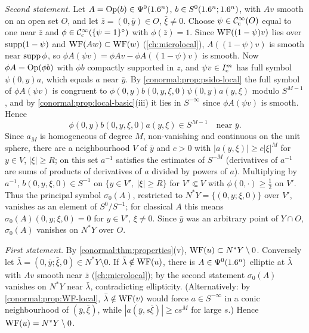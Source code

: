 \emph{Second statement.} Let $A=\operatorname{Op}(b)\in\Psi^{0}(1.6^n)$, $b\in S^0(1.6^n;1.6^n)$, with $Av$
smooth on an open set $O$, and let $\bar z=(0,\bar y)\in O$, $\bar\xi\ne0$. Choose
$\psi\in\mathcal{C}^\infty_{\mathrm{c}}(O)$ equal to one near $\bar z$ and $\phi\in\mathcal{C}^\infty_{\mathrm{c}}(\{\psi=1\}^\circ)$ with
$\phi(\bar z)=1$. Since $\operatorname{WF}((1-\psi)v)$ lies over $\operatorname{supp}(1-\psi)$ and $\operatorname{WF}(Aw)\subset\operatorname{WF}(w)$
(\cref{ch:microlocal}), $A((1-\psi)v)$ is smooth near $\operatorname{supp}\phi$, so $\phi A(\psi v)=\phi Av
-\phi A((1-\psi)v)$ is smooth. Now $\phi A=\operatorname{Op}(\phi b)$ with $\phi b$ compactly supported in
$z$, and $\psi v\in I^{m}_{\mathrm c}$ has full symbol $\psi(0,y)a$, which equals $a$ near
$\bar y$. By \cref{conormal:prop:psido-local} the full symbol of $\phi A(\psi v)$ is
congruent to $\phi(0,y)b(0,y,\xi,0)\psi(0,y)a(y,\xi)$ modulo $S^{M-1}$, and by
\cref{conormal:prop:local-basic}(iii) it lies in $S^{-\infty}$ since $\phi A(\psi v)$ is
smooth. Hence
\begin{equation*}
\phi(0,y)b(0,y,\xi,0)a(y,\xi)\in S^{M-1}\quad\text{near }\bar y .
\end{equation*}
Since $a_M$ is homogeneous of degree $M$, non-vanishing and continuous on the unit sphere,
there are a neighbourhood $V$ of $\bar y$ and $c>0$ with $|a(y,\xi)|\ge c|\xi|^M$ for
$y\in V$, $|\xi|\ge R$; on this set $a^{-1}$ satisfies the estimates of $S^{-M}$ (derivatives
of $a^{-1}$ are sums of products of derivatives of $a$ divided by powers of $a$). Multiplying
by $a^{-1}$, $b(0,y,\xi,0)\in S^{-1}$ on $\{y\in V',\ |\xi|\ge R\}$ for $V'\Subset V$ with
$\phi(0,\cdot)\ge\frac12$ on $V'$. Thus the principal symbol $\sigma_0(A)$, restricted to
$N^*Y=\{(0,y;\xi,0)\}$ over $V'$, vanishes as an element of $S^{0}/S^{-1}$; for classical
$A$ this means $\sigma_0(A)(0,y;\xi,0)=0$ for $y\in V'$, $\xi\ne0$. Since $\bar y$ was an
arbitrary point of $Y\cap O$, $\sigma_0(A)$ vanishes on $N^*Y$ over $O$.

\emph{First statement.} By \cref{conormal:thm:properties}(v), $\operatorname{WF}(u)\subset N^*Y\setminus0$.
Conversely let $\bar\lambda=(0,\bar y;\bar\xi,0)\in N^*Y\setminus0$. If $\bar\lambda\notin
\operatorname{WF}(u)$, there is $A\in\Psi^{0}(1.6^n)$ elliptic at $\bar\lambda$ with $Av$ smooth near
$\bar z$ (\cref{ch:microlocal}); by the second statement $\sigma_0(A)$ vanishes on $N^*Y$ near
$\bar\lambda$, contradicting ellipticity. (Alternatively: by \cref{conormal:prop:WF-local},
$\bar\lambda\notin\operatorname{WF}(v)$ would force $a\in S^{-\infty}$ in a conic neighbourhood of
$(\bar y,\bar\xi)$, while $|a(\bar y,s\bar\xi)|\ge cs^M$ for large $s$.) Hence
$\operatorname{WF}(u)=N^*Y\setminus0$.
